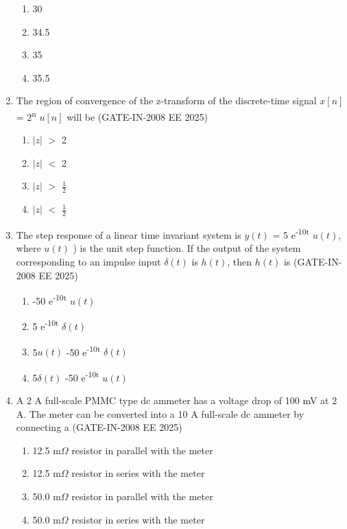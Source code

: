 \documentclass[journal,12pt,onecolumn]{IEEEtran}
\theoremstyle{remark}
\begin{document}
\begin{enumerate}[label=Q.\arabic*,start=1]
          \begin{enumerate} 
              \item  30
              \item  34.5
              \item  35
              \item  35.5
           \end{enumerate}

\item The region of convergence of the z-transform of the discrete-time signal $x[n]$ = 2\textsuperscript{n} $u[n]$ will be  (GATE-IN-2008 EE 2025)
          \begin{enumerate} 
              \item  \( |z| \) $>$ 2
              \item  \( |z| \) $<$ 2
              \item  \( |z| \) $>$ $\frac{1}{2}$
              \item  \( |z| \) $<$ $\frac{1}{2}$
           \end{enumerate}


\item The step response of a linear time invariant system is $y(t)$ = 5 e\textsuperscript{-10t} $u(t)$, where $u(t)$ ) is the unit step
function. If the output of the system corresponding to an impulse input $\delta(t)$ is $h(t)$, then $h(t)$ is (GATE-IN-2008 EE 2025)
          \begin{enumerate} 
                \item -50 e\textsuperscript{-10t} $u(t)$
                \item 5 e\textsuperscript{-10t} $\delta(t)$
                \item 5$u(t)$ -50 e\textsuperscript{-10t} $\delta(t)$
                \item 5$\delta(t)$ -50 e\textsuperscript{-10t} $u(t)$
                
           \end{enumerate}

\item A 2 A full-scale PMMC type dc ammeter has a voltage drop of 100 mV at 2 A. The meter can be
converted into a 10 A full-scale dc ammeter by connecting a (GATE-IN-2008 EE 2025)
           \begin{enumerate} 
              \item  12.5 m$\Omega$ resistor in parallel with the meter 
              \item  12.5 m$\Omega$ resistor in series with the meter 
              \item  50.0 m$\Omega$ resistor in parallel with the meter 
              \item  50.0 m$\Omega$ resistor in series with the meter 
           \end{enumerate}


\end{enumerate}
\end{document}
